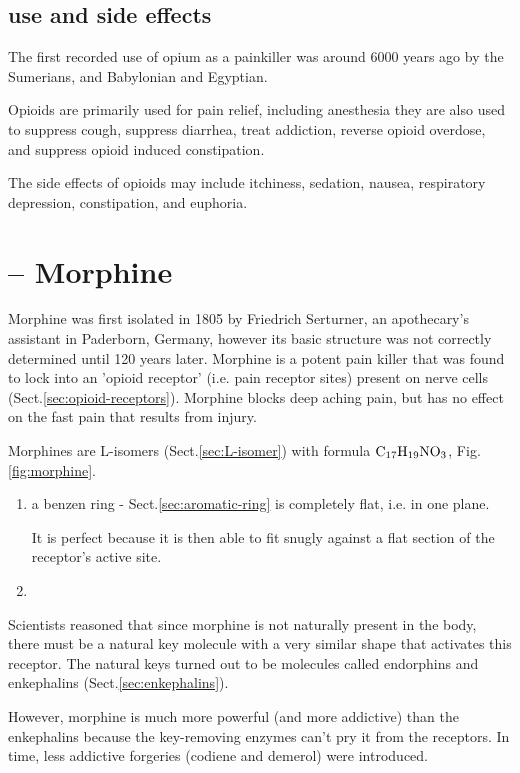 \subsection{use and side effects}

The first recorded use of opium as a painkiller was around 6000 years ago by the
Sumerians, and Babylonian and Egyptian.

Opioids are primarily used for pain relief, including anesthesia they are also
used to suppress cough, suppress diarrhea, treat addiction, reverse opioid overdose, and
suppress opioid induced constipation. 




The side effects of opioids may include itchiness, sedation, nausea, respiratory
depression, constipation, and euphoria. 
\section{-- Morphine}
\label{sec:morphine}

Morphine was first isolated in 1805 by Friedrich Serturner, an apothecary's
assistant in Paderborn, Germany, however its basic structure was not correctly
determined until 120 years later.  Morphine is a potent pain killer that was
found to lock into an 'opioid receptor' (i.e. pain receptor sites) present on
nerve cells (Sect.\ref{sec:opioid-receptors}).
Morphine blocks deep aching pain, but has no effect on the fast pain that
results from injury. 

Morphines are L-isomers (Sect.\ref{sec:L-isomer}) with formula
$\ce{C17H19NO3}$, Fig.\ref{fig:morphine}.
\begin{enumerate}
  \item a benzen ring - Sect.\ref{sec:aromatic-ring}
  is completely flat, i.e. in one plane.
  
  It is perfect because it is then able to fit snugly against a flat section of
  the receptor's active site. 
  
  
  \item 
\end{enumerate}
Scientists reasoned that since morphine is not naturally present in the body,
there must be a natural key molecule with a very similar shape that activates
this receptor. The natural keys turned out to be molecules called endorphins
and enkephalins (Sect.\ref{sec:enkephalins}).

However, morphine is much more powerful (and more addictive) than the
enkephalins because the key-removing enzymes can't pry it from the receptors. In
time, less addictive forgeries (codiene and demerol) were introduced.

